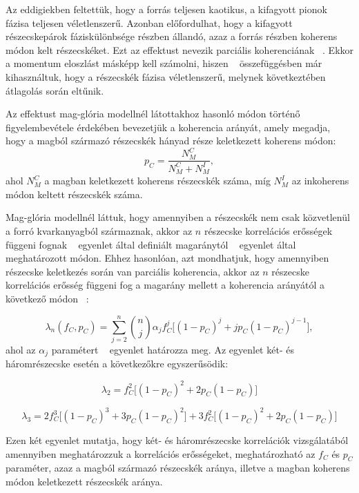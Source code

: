 \documentclass[11pt,a4paper]{article}
\numberwithin{equation}{subsection}
\numberwithin{figure}{section}
\begin{document}
Az eddigiekben feltettük, hogy a forrás teljesen kaotikus, a kifagyott pionok fázisa teljesen véletlenszerű. Azonban előfordulhat, hogy a kifagyott részecskepárok fáziskülönbsége részben állandó, azaz a forrás részben koherens módon kelt részecskéket. Ezt az effektust nevezik parciális koherenciának ~\cite{Csorgo:1998tn, Csorgo:1999sj, Csorgo:1997uf}. Ekkor a momentum eloszlást másképp kell számolni, hiszen ~ összefüggésben már kihasználtuk, hogy a részecskék fázisa véletlenszerű, melynek következtében átlagolás során eltűnik. 

Az effektust mag-glória modellnél látottakhoz hasonló módon történő figyelembevétele érdekében bevezetjük a koherencia arányát, amely megadja, hogy a magból származó részecskék hányad része keletkezett koherens módon:
\begin{equation}
p_C = \frac{N_M^C}{N_M^C+N_M^I},
\end{equation}
ahol $N_M^C$ a magban keletkezett koherens részecskék száma, míg $N_M^I$ az inkoherens módon keltett részecskék száma.

Mag-glória modellnél láttuk, hogy amennyiben a részecskék nem csak közvetlenül a forró kvarkanyagból származnak, akkor az $n$ részecske korrelációs erősségek függeni fognak ~ egyenlet által definiált magaránytól ~ egyenlet által meghatározott módon. Ehhez hasonlóan, azt mondhatjuk, hogy amennyiben részecske keletkezés során van parciális koherencia, akkor az $n$ részecske korrelációs erősség függeni fog a magarány mellett a koherencia arányától a következő módon ~\cite{Csorgo:1998tn, Csorgo:1997uf}:

\begin{equation}
\lambda_n(f_C, p_C) = \sum_{j=2}^{n}\binom{n}{j}\alpha_j f_C^j\big[(1-p_C)^j+jp_C(1-p_C)^{j-1}\big],
\end{equation}
ahol az $\alpha_j$ paramétert ~ egyenlet határozza meg. Az egyenlet két- és háromrészecske esetén a következőkre egyszerűsödik:

\begin{equation}
\lambda_2 =  f_C^2\big[(1-p_C)^2+2p_C(1-p_C)\big]
\end{equation}

\begin{equation}
\lambda_3 =  2f_C^3\big[(1-p_C)^3+3p_C(1-p_C)^2\big]+3f_C^2\big[(1-p_C)^2+2p_C(1-p_C)\big]
\end{equation}

Ezen két egyenlet mutatja, hogy két- és háromrészecske korrelációk vizsgálatából amennyiben meghatározzuk a korrelációs erősségeket, meghatározható az $f_C$ és $p_C$ paraméter, azaz a magból származó részecskék aránya, illetve a magban koherens módon keletkezett részecskék aránya.
\end{document}
